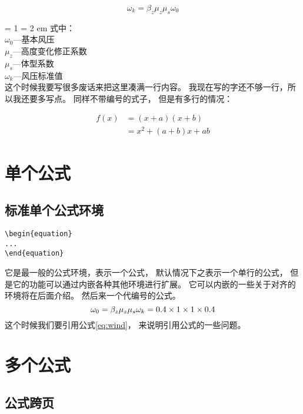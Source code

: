 \documentclass[b5paper,UTF8]{book}
\begin{document}
\[ \omega_k = \beta_z \mu_z \mu_s \omega_0 \]

\hangafter = 1
\hangindent = 2 em
式中：\\
$\omega_0$---基本风压\\
$\mu_z$---高度变化修正系数\\
$\mu_s$---体型系数\\
$\omega_k$---风压标准值\\



这个时候我要写很多废话来把这里凑满一行内容。
我现在写的字还不够一行，所以我还要多写点。
同样不带编号的式子，
但是有多行的情况：

\begin{align*}
    f(x) &= (x+a)(x+b) \\
    &= x^2 + (a+b)x + ab
\end{align*}


\section{单个公式}



\subsection{标准单个公式环境}

\begin{verbatim}
\begin{equation}
...
\end{equation} 
\end{verbatim}

它是最一般的公式环境，表示一个公式，
默认情况下之表示一个单行的公式，
但是它的功能可以通过内嵌各种其他环境进行扩展。
它可以内嵌的一些关于对齐的环境将在后面介绍。
然后来一个代编号的公式。
\begin{equation}\label{eq:wind}
    \omega_0 = \beta_z \mu_z \mu_s \omega_k \\
            = 0.4 \times 1 \times 1 \times 0.4
\end{equation}
这个时候我们要引用公式\ref{eq:wind}，
来说明引用公式的一些问题。


\section{多个公式}

\subsection{公式跨页}
\end{document}
